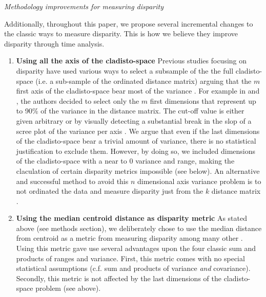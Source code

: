 \documentclass[12pt,letterpaper]{article}
\renewcommand{\subsection}[1]{%
\bigskip
\begin{center}
\begin{large}
\normalfont\itshape #1
\end{large}
\end{center}}
\begin{document}
\subsection{Methodology improvements for measuring disparity}
Additionally, throughout this paper, we propose several incremental changes to the classic ways to measure disparity.
This is how we believe they improve disparity through time analysis.
\begin{enumerate}
    \item \textbf{Using all the axis of the cladisto-space}
    Previous studies focusing on disparity have used various ways to select a subsample of the the full cladisto-space (i.e. a sub-sample of the ordinated distance matrix) arguing that the $m$ first axis of the cladisto-space bear most of the variance \citep[e.g][]{brusatte50,cisneros2010,prentice2011,anderson2012using,Butler2012,Hughes20082013,bentonmodels2014}.
    For example in \cite{Brusatte12092008} and \cite{toljagictriassic-jurassic2013}, the authors decided to select only the $m$ first dimensions that represent up to 90\% of the variance in the distance matrix.
    The cut-off value is either given arbitrary or by visually detecting a substantial break in the slop of a scree plot of the variance per axis \citep{Wills1994}.
    We argue that even if the last dimensions of the cladisto-space bear a trivial amount of variance, there is no statistical justification to exclude them.
    However, by doing so, we included dimensions of the cladisto-space with a near to $0$ variance and range, making the claculation of certain disparity metrics impossible (see below).
    An alternative and successful method to avoid this $n$ dimensional axis variance problem is to not ordinated the data and measure disparity just from the $k$ distance matrix \citep{bensonfaunal2014,Close2015}.
    \item \textbf{Using the median centroid distance as disparity metric}
    As stated above (see methods section), we deliberately chose to use the median distance from centroid as a metric from measuring disparity among many other \citep[e.g.][]{Wills1994,Ciampaglio2004,thorneresetting2011,hopkinsdecoupling2013,huang2015origins}.
    Using this metric gave use several advantages upon the four classic sum and products of ranges and variance.
    First, this metric comes with no special statistical assumptions (c.f. sum and products of variance \textit{and} covariance).
    Secondly, this metric is not affected by the last dimensions of the cladisto-space problem (see above).

\end{enumerate}
\end{document}
